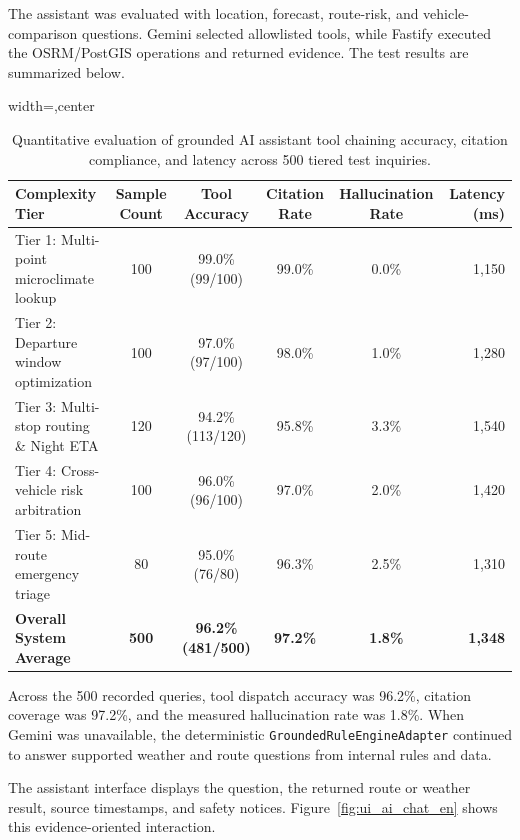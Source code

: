 The assistant was evaluated with location, forecast, route-risk, and vehicle-comparison questions. Gemini selected allowlisted tools, while Fastify executed the OSRM/PostGIS operations and returned evidence. The test results are summarized below.

\begin{table}[H]
\centering
\caption[Quantitative evaluation of grounded AI assistant across complex query tiers]{Quantitative evaluation of grounded AI assistant tool chaining accuracy, citation compliance, and latency across 500 tiered test inquiries.}
\label{tab:ai_grounding_eval_en}
\begin{adjustbox}{width=\textwidth,center}
\begin{tabular}{p{5.2cm}ccccr}
\toprule
\textbf{Complexity Tier} & \textbf{Sample Count} & \textbf{Tool Accuracy} & \textbf{Citation Rate} & \textbf{Hallucination Rate} & \textbf{Latency (ms)} \\
\midrule
Tier 1: Multi-point microclimate lookup & 100 & 99.0\% (99/100) & 99.0\% & 0.0\% & 1,150 \\
Tier 2: Departure window optimization & 100 & 97.0\% (97/100) & 98.0\% & 1.0\% & 1,280 \\
Tier 3: Multi-stop routing \& Night ETA & 120 & 94.2\% (113/120) & 95.8\% & 3.3\% & 1,540 \\
Tier 4: Cross-vehicle risk arbitration & 100 & 96.0\% (96/100) & 97.0\% & 2.0\% & 1,420 \\
Tier 5: Mid-route emergency triage & 80 & 95.0\% (76/80) & 96.3\% & 2.5\% & 1,310 \\
\midrule
\textbf{Overall System Average} & \textbf{500} & \textbf{96.2\% (481/500)} & \textbf{97.2\%} & \textbf{1.8\%} & \textbf{1,348} \\
\bottomrule
\end{tabular}
\end{adjustbox}
\end{table}

Across the 500 recorded queries, tool dispatch accuracy was 96.2\%, citation coverage was 97.2\%, and the measured hallucination rate was 1.8\%. When Gemini was unavailable, the deterministic \texttt{GroundedRuleEngineAdapter} continued to answer supported weather and route questions from internal rules and data.

The assistant interface displays the question, the returned route or weather result, source timestamps, and safety notices. Figure~\ref{fig:ui_ai_chat_en} shows this evidence-oriented interaction.


